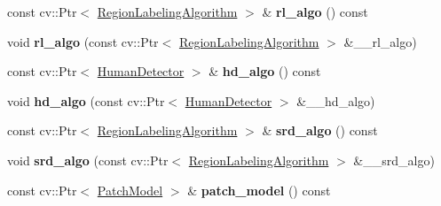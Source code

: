 \begin{DoxyCompactItemize}
\item 
\hypertarget{classskl_1_1_table_object_manager_aa7aedcaa74f150db8060dde5cb417d2c}{}\label{classskl_1_1_table_object_manager_aa7aedcaa74f150db8060dde5cb417d2c} 
const cv\+::\+Ptr$<$ \hyperlink{classskl_1_1_filter_mat2_mat}{Region\+Labeling\+Algorithm} $>$ \& {\bfseries rl\+\_\+algo} () const
\item 
\hypertarget{classskl_1_1_table_object_manager_a6afd7621e5746ca96d810fb1f2f4d70d}{}\label{classskl_1_1_table_object_manager_a6afd7621e5746ca96d810fb1f2f4d70d} 
void {\bfseries rl\+\_\+algo} (const cv\+::\+Ptr$<$ \hyperlink{classskl_1_1_filter_mat2_mat}{Region\+Labeling\+Algorithm} $>$ \&\+\_\+\+\_\+rl\+\_\+algo)
\item 
\hypertarget{classskl_1_1_table_object_manager_a71f8847e8689df23ae15e254f76ef6e6}{}\label{classskl_1_1_table_object_manager_a71f8847e8689df23ae15e254f76ef6e6} 
const cv\+::\+Ptr$<$ \hyperlink{classskl_1_1_filter_mat2_mat}{Human\+Detector} $>$ \& {\bfseries hd\+\_\+algo} () const
\item 
\hypertarget{classskl_1_1_table_object_manager_a4a94786bf6a85978dc03485721d380d6}{}\label{classskl_1_1_table_object_manager_a4a94786bf6a85978dc03485721d380d6} 
void {\bfseries hd\+\_\+algo} (const cv\+::\+Ptr$<$ \hyperlink{classskl_1_1_filter_mat2_mat}{Human\+Detector} $>$ \&\+\_\+\+\_\+hd\+\_\+algo)
\item 
\hypertarget{classskl_1_1_table_object_manager_a41e263a687e4430210ccb164f2570b7f}{}\label{classskl_1_1_table_object_manager_a41e263a687e4430210ccb164f2570b7f} 
const cv\+::\+Ptr$<$ \hyperlink{classskl_1_1_filter_mat2_mat}{Region\+Labeling\+Algorithm} $>$ \& {\bfseries srd\+\_\+algo} () const
\item 
\hypertarget{classskl_1_1_table_object_manager_a647cc2a28a4dd946d4dec2ae2ffa2204}{}\label{classskl_1_1_table_object_manager_a647cc2a28a4dd946d4dec2ae2ffa2204} 
void {\bfseries srd\+\_\+algo} (const cv\+::\+Ptr$<$ \hyperlink{classskl_1_1_filter_mat2_mat}{Region\+Labeling\+Algorithm} $>$ \&\+\_\+\+\_\+srd\+\_\+algo)
\item 
\hypertarget{classskl_1_1_table_object_manager_ad0d5797277e9765627b3cd101db3e921}{}\label{classskl_1_1_table_object_manager_ad0d5797277e9765627b3cd101db3e921} 
const cv\+::\+Ptr$<$ \hyperlink{classskl_1_1_patch_model}{Patch\+Model} $>$ \& {\bfseries patch\+\_\+model} () const
\item 
\hypertarget{classskl_1_1_table_object_manager_ad539b210b4ecf5ff114f85250fd1479e}{}\label{classskl_1_1_table_object_manager_ad539b210b4ecf5ff114f85250fd1479e} 

\end{DoxyCompactItemize}
